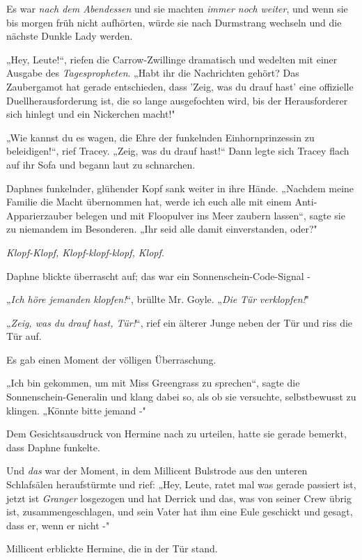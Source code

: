 {Es war \emph{nach dem Abendessen} und sie machten \emph{immer noch} \emph{weiter}, und wenn sie bis morgen früh nicht aufhörten, würde sie nach Durmstrang wechseln und die nächste Dunkle Lady werden.

„Hey, Leute!“, riefen die Carrow-Zwillinge dramatisch und wedelten mit einer Ausgabe des \emph{Tagespropheten}. „Habt ihr die Nachrichten gehört? Das Zaubergamot hat gerade entschieden, dass 'Zeig, was du drauf hast' eine offizielle Duellherausforderung ist, die so lange ausgefochten wird, bis der Herausforderer sich hinlegt und ein Nickerchen macht!"

„Wie kannst du es wagen, die Ehre der funkelnden Einhornprinzessin zu beleidigen!“, rief Tracey. „Zeig, was du drauf hast!“ Dann legte sich Tracey flach auf ihr Sofa und begann laut zu schnarchen.

Daphnes funkelnder, glühender Kopf sank weiter in ihre Hände. „Nachdem meine Familie die Macht übernommen hat, werde ich euch alle mit einem Anti-Apparierzauber belegen und mit Floopulver ins Meer zaubern lassen“, sagte sie zu niemandem im Besonderen. „Ihr seid alle damit einverstanden, oder?"

\emph{\emph{Klopf-Klopf, Klopf-klopf-klopf, Klopf.}}

Daphne blickte überrascht auf; das war ein Sonnenschein-Code-Signal -

„\emph{Ich höre jemanden klopfen!}“, brüllte Mr. Goyle. „\emph{Die} \emph{Tür} \emph{verklopfen!}"

„\emph{Zeig, was du} \emph{drauf hast, Tür!}“, rief ein älterer Junge neben der Tür und riss die Tür auf.

Es gab einen Moment der völligen Überraschung.

„Ich bin gekommen, um mit Miss Greengrass zu sprechen“, sagte die Sonnenschein-Generalin und klang dabei so, als ob sie versuchte, selbstbewusst zu klingen. „Könnte bitte jemand -"

Dem Gesichtsausdruck von Hermine nach zu urteilen, hatte sie gerade bemerkt, dass Daphne funkelte.

Und \emph{das} war der Moment, in dem Millicent Bulstrode aus den unteren Schlafsälen heraufstürmte und rief: „Hey, Leute, ratet mal was gerade passiert ist, jetzt ist \emph{Granger} losgezogen und hat Derrick und das, was von seiner Crew übrig ist, zusammengeschlagen, und sein Vater hat ihm eine Eule geschickt und gesagt, dass er, wenn er nicht -"

Millicent erblickte Hermine, die in der Tür stand.

}
